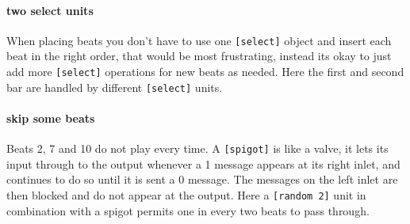 \paragraph{two select units}
When placing beats you don't have to use one \verb+[select]+ object
and insert each beat in the right order, that would be most
frustrating, instead its okay to just add more \verb+[select]+ 
operations for new beats as needed. Here the first and
second bar are handled by different \verb+[select]+ units.

\paragraph{skip some beats}
Beats 2, 7 and 10 do not play every time.
A \verb+[spigot]+ is like a valve, it lets its input through to the output
whenever a 1 message appears at its right inlet, and continues to do so
until it is sent a 0 message. The messages on the left inlet are then
blocked and do not appear at the output. Here a \verb+[random 2]+ unit
in combination with a spigot permits one in every two beats to pass through.

